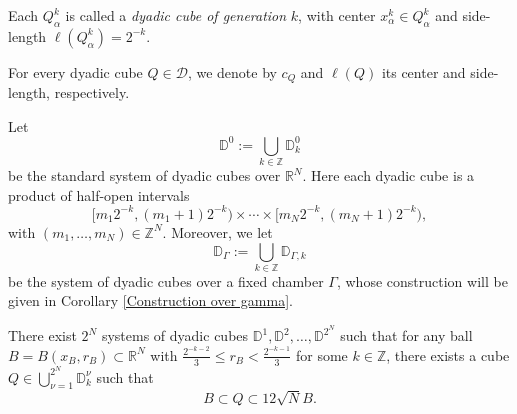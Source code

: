 \documentclass[12pt]{amsart}
\begin{document}
Each $Q^k_{\alpha}$ is called a \textit{dyadic cube of generation} $k$, with center $x^k_{\alpha}\in Q^k_{\alpha}$ and side-length $\ell(Q^k_{\alpha})=2^{-k}$.
\begin{nota}
For every dyadic cube $Q\in\mathscr{D}$, we denote by $c_Q$ and $\ell(Q)$ its center and side-length, respectively.
\end{nota}

\begin{nota}\label{standardsystem}
Let $$\mathbb{D}^0:=\bigcup_{k\in\mathbb{Z}}\mathbb{D}_k^0$$ be the standard system of dyadic cubes over $\mathbb{R}^N$.
Here each dyadic cube is a product of half-open intervals
\[
[m_1 2^{-k}, (m_1+1)2^{-k}) \times \cdots \times [m_N 2^{-k}, (m_N+1)2^{-k}),
\]
with $(m_1,\ldots,m_N)\in \mathbb{Z}^N$. Moreover, we let $$\mathbb{D}_{\Gamma}:=\bigcup_{k\in\mathbb{Z}}\mathbb{D}_{\Gamma,k}$$ be the system of dyadic cubes over a fixed chamber $\Gamma$, whose  construction will be given in Corollary \ref{Construction over gamma}.
\end{nota}


\begin{lemma}\label{Nsystems}
There exist $2^N$ systems of dyadic cubes $\mathbb{D}^1,\mathbb{D}^2,\ldots,\mathbb{D}^{2^N}$ such that for any ball $B=B(x_B,r_B)\subset \mathbb{R}^N$ with $\frac{2^{-k-2}}{3}\leq r_B< \frac{2^{-k-1}}{3}$ for some $k\in\mathbb{Z}$,  there exists a cube ${\displaystyle Q\in\bigcup_{\nu=1}^{2^N}\mathbb{D}^\nu_k}$ such that
$$B\subset Q\subset 12\sqrt{N} B.$$
\end{lemma}
\end{document}
